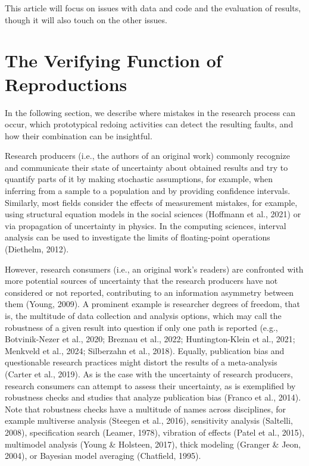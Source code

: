 \documentclass[authordate, meta]{jote-new-article}
\begin{document}
	This article will focus on issues with data and code and the evaluation of results, though it will also touch on the other issues.

	\section{The Verifying Function of Reproductions}

	In the following section, we describe where mistakes in the research process can occur, which prototypical redoing activities can detect the resulting faults, and how their combination can be insightful.



	Research producers (i.e., the authors of an original work) commonly recognize and communicate their state of uncertainty about obtained results and try to quantify parts of it by making stochastic assumptions, for example, when inferring from a sample to a population and by providing confidence intervals. Similarly, most fields consider the effects of measurement mistakes, for example, using structural equation models in the social sciences (Hoffmann et al., 2021) or via propagation of uncertainty in physics. In the computing sciences, interval analysis can be used to investigate the limits of floating-point operations (Diethelm, 2012).



	However, research consumers (i.e., an original work's readers) are confronted with more potential sources of uncertainty that the research producers have not considered or not reported, contributing to an information asymmetry between them (Young, 2009). A prominent example is researcher degrees of freedom, that is, the multitude of data collection and analysis options, which may call the robustness of a given result into question if only one path is reported (e.g., Botvinik-Nezer et al., 2020; Breznau et al., 2022; Huntington-Klein et al., 2021; Menkveld et al., 2024; Silberzahn et al., 2018). Equally, publication bias and questionable research practices might distort the results of a meta-analysis (Carter et al., 2019). As is the case with the uncertainty of research producers, research consumers can attempt to assess their uncertainty, as is exemplified by robustness checks and studies that analyze publication bias (Franco et al., 2014). Note that robustness checks have a multitude of names across disciplines, for example multiverse analysis (Steegen et al., 2016), sensitivity analysis (Saltelli, 2008), specification search (Leamer, 1978), vibration of effects (Patel et al., 2015), multimodel analysis (Young \& Holsteen, 2017), thick modeling (Granger \& Jeon, 2004), or Bayesian model averaging (Chatfield, 1995).
\end{document}
